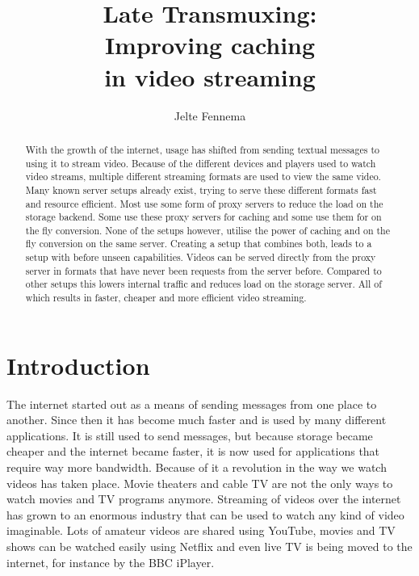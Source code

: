 \documentclass[twoside,openright]{uva-bachelor-thesis}
\title{Late Transmuxing:\\Improving caching \\in video streaming}
\author{Jelte Fennema}
\begin{document}
\maketitle

\begin{abstract}
    With the growth of the internet, usage has shifted from sending textual
    messages to using it to stream video. Because of the different devices and
    players used to watch video streams, multiple different streaming formats
    are used to view the same video. Many known server setups already exist,
    trying to serve these different formats fast and resource efficient. Most
    use some form of proxy servers to reduce the load on the storage backend.
    Some use these proxy servers for caching and some use them for on the fly
    conversion. None of the setups however, utilise the power of caching and on
    the fly conversion on the same server. Creating a setup that combines both,
    leads to a setup with before unseen capabilities. Videos can be served
    directly from the proxy server in formats that have never been requests from
    the server before. Compared to other setups this lowers internal traffic
    and reduces load on the storage server. All of which results in faster,
    cheaper and more efficient video streaming.

\end{abstract}


\tableofcontents

\chapter{Introduction}
The internet started out as a means of sending messages from one place to
another. Since then it has become much faster and is used by many different
applications. It is still used to send messages, but because storage became
cheaper and the internet became faster, it is now used for applications that
require way more bandwidth. Because of it a revolution in the way we watch videos
has taken place. Movie theaters and cable TV are not the only ways to watch
movies and TV programs anymore. Streaming of videos over the internet has grown
to an enormous industry that can be used to watch any kind of video imaginable.
Lots of amateur videos are shared using YouTube, movies and TV shows can be
watched easily using Netflix and even live TV is being moved to the internet,
for instance by the BBC iPlayer.
\end{document}
